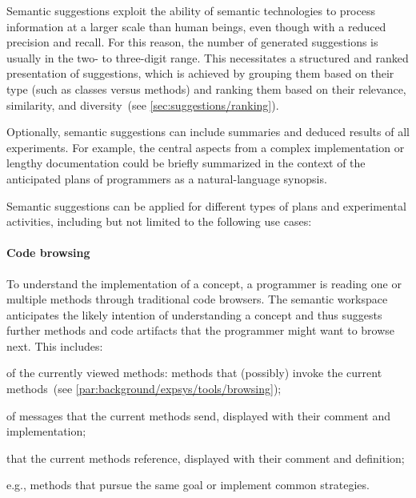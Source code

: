 Semantic suggestions exploit the ability of semantic technologies to process information at a larger scale than human beings, even though with a reduced precision and recall.
For this reason, the number of generated suggestions is usually in the two- to three-digit range.
This necessitates a structured and ranked presentation of suggestions, which is achieved by grouping them based on their type (such as classes versus methods) and ranking them based on their relevance, similarity, and diversity~(see \cref{sec:suggestions/ranking}).

Optionally, semantic suggestions can include summaries and deduced results of all experiments.
For example, the central aspects from a complex implementation or lengthy documentation could be briefly summarized in the context of the anticipated plans of programmers as a natural-language synopsis.

Semantic suggestions can be applied for different types of plans and experimental activities, including but not limited to the following use cases:

	\paragraph{Code browsing}
	To understand the implementation of a concept, a programmer is reading one or multiple methods through traditional code browsers.
	The semantic workspace anticipates the likely intention of understanding a concept and thus suggests further methods and code artifacts that the programmer might want to browse next.
	This includes:

	\begin{description}[noextralabelsep]
		\item[senders] of the currently viewed methods: methods that (possibly) invoke the current methods~(see \cref{par:background/expsys/tools/browsing});
		\item[implementors] of messages that the current methods send, displayed with their comment and implementation;
		\item[classes] that the current methods reference, displayed with their comment and definition;
		\item[similar methods,] e.g., methods that pursue the same goal or implement common strategies.
	\end{description}

